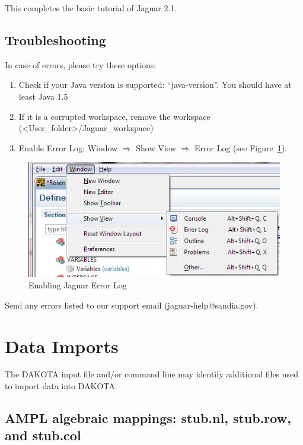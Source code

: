 This completes the basic tutorial of Jaguar 2.1.

\subsection{Troubleshooting}

In case of errors, please try these options:
\begin{enumerate}
\item  Check if your Java version is supported: ``java-version''. You should have at least Java 1.5
\item  If it is a corrupted workspace, remove the workspace (<User\_folder>/Jaguar\_workspace)
\item  Enable Error Log: Window $\Rightarrow$ Show View $\Rightarrow$ Error Log (see Figure~\ref{fig:input:11ShowView}).
\end{enumerate}

\begin{figure}[htbp]
  \centering
  \includegraphics[scale=0.6]{images/11ShowView}
  \caption{Enabling Jaguar Error Log}
  \label{fig:input:11ShowView}
\end{figure}


Send any errors listed to our support email (jaguar-help@sandia.gov).

\newpage
\section{Data Imports}\label{input:import}

The DAKOTA input file and/or command line may identify additional
files used to import data into DAKOTA.

\subsection{AMPL algebraic mappings: stub.nl, stub.row, and stub.col}

